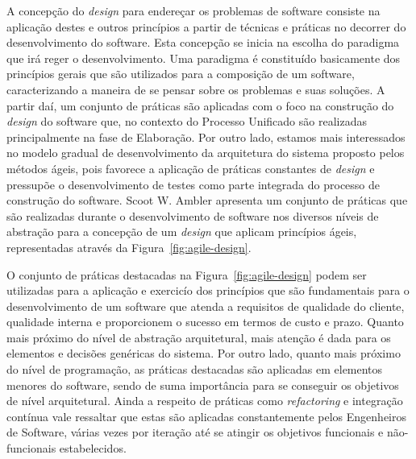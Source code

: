 %

A concepção do \emph{design} para endereçar os problemas de software consiste na aplicação destes e outros princípios a partir de técnicas e práticas no decorrer do desenvolvimento do software. Esta concepção se inicia na escolha do paradigma que irá reger o desenvolvimento. Uma paradigma é constituído basicamente dos princípios gerais que são utilizados para a composição de um software, caracterizando a maneira de se pensar sobre os problemas e suas soluções. A partir daí, um conjunto de práticas são aplicadas com o foco na construção do \emph{design} do software que, no contexto do Processo Unificado são realizadas principalmente na fase de Elaboração. Por outro lado, estamos mais interessados no modelo gradual de desenvolvimento da arquitetura do sistema proposto pelos métodos ágeis, pois favorece a aplicação de práticas constantes de \emph{design} e pressupõe o desenvolvimento de testes como parte integrada do processo de construção do software. Scoot W. Ambler apresenta um conjunto de práticas que são realizadas durante o desenvolvimento de software nos diversos níveis de abstração para a concepção de um \emph{design} que aplicam princípios ágeis, representadas através da Figura~\ref{fig:agile-design}.

%


%

O conjunto de práticas destacadas na Figura~\ref{fig:agile-design} podem ser utilizadas para a aplicação e exercicío dos princípios que são fundamentais para o desenvolvimento de um software que atenda a requisitos de qualidade do cliente, qualidade interna e proporcionem o sucesso em termos de custo e prazo. Quanto mais próximo do nível de abstração arquitetural, mais atenção é dada para os elementos e decisões genéricas do sistema. Por outro lado, quanto mais próximo do nível de programação, as práticas destacadas são aplicadas em elementos menores do software, sendo de suma importância para se conseguir os objetivos de nível arquitetural. Ainda a respeito de práticas como \emph{refactoring} e integração contínua vale ressaltar que estas são aplicadas constantemente pelos Engenheiros de Software, várias vezes por iteração até se atingir os objetivos funcionais e não-funcionais estabelecidos.

